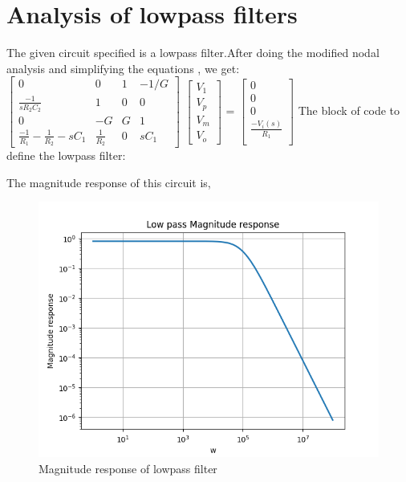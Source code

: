 \documentclass[11pt, a4paper]{article}
\begin{document}
\section*{Analysis of lowpass filters}
The given circuit specified is a lowpass filter.After doing the modified nodal analysis and simplifying the equations , we get:
\newline
$\begin{bmatrix}
    0   & 0 & 1  & -1/G \\
    \frac{-1}{sR_2C_2}  & 1 & 0 & 0\\
    0  & -G & G & 1 \\
    \frac{-1}{R_1} - \frac{1}{R_2} - sC_1 & \frac{1}{R_2} & 0 & sC_1
\end{bmatrix}$
$\begin{bmatrix}
    V_1\\
    V_p\\
    V_m \\
    V_o
\end{bmatrix}$
=
$\begin{bmatrix}
    0 \\
    0 \\
    0 \\
    \frac{-V_i(s)}{R_1} \\
    
\end{bmatrix}$
\newline
The block of code to define the lowpass filter:

\newline
The magnitude response of this circuit is, 
\begin{figure}[!tbh]
\centering
\includegraphics[scale=0.5]{assgn8_plot1.png} 
\caption{Magnitude response of lowpass filter}
\label{fig1}
\end{figure}
\end{document}
